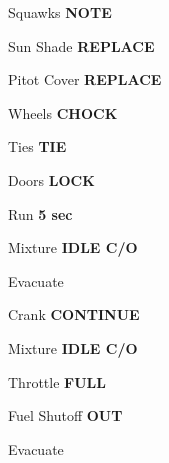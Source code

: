 \documentclass[8pt]{article}
\begin{document}
\begin{multicols*}{3}
Squawks \dotfill \textbf{NOTE}

Sun Shade \dotfill \textbf{REPLACE}

Pitot Cover \dotfill \textbf{REPLACE}

Wheels \dotfill \textbf{CHOCK}

Ties \dotfill \textbf{TIE}

Doors \dotfill \textbf{LOCK} \\

\colorbox{red!80}{}

\colorbox{orange!80}{}

Run \dotfill \textbf{5 sec}

Mixture \dotfill \textbf{IDLE C/O}

Evacuate \dotfill

\colorbox{orange!80}{}

Crank \dotfill \textbf{CONTINUE}

Mixture \dotfill \textbf{IDLE C/O}

Throttle \dotfill \textbf{FULL}

Fuel Shutoff \dotfill \textbf{OUT}

Evacuate \dotfill \\

\end{multicols*}


\pagebreak
\end{document}

